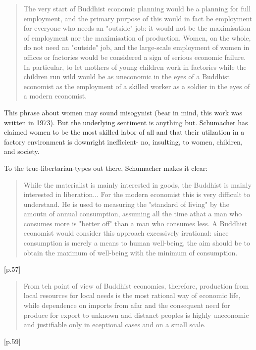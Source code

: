 \documentclass[letterpaper]{article}
\begin{document}

\begin{quote}
The very start of Buddhist economic planning would be a planning for full employment, and the primary purpose of this would in fact be employment for everyone who needs an "outside" job: it would not be the maximisation of employment nor the maximisation of production. Women, on the whole, do not need an "outside" job, and the large-scale employment of women in offices or factories would be considered a sign of serious economic failure. In particular, to let mothers of young children work in factories while the children run wild would be as uneconomic in the eyes of a Buddhist economist as the employment of a skilled worker as a soldier in the eyes of a modern economist.
\end{quote}

This phrase about women may sound misogynist (bear in mind, this work was written in 1973). But the underlying sentiment is anything but. Schumacher has claimed women to be the most skilled labor of all and that their utilzation in a factory environment is downright inefficient- no, insulting, to women, children, and society.

To the true-libertarian-types out there, Schumacher makes it clear:

\begin{quote}
While the materialist is mainly interested in goods, the Buddhist is mainly interested in liberation... For the modern economist this is very difficult to understand. He is used to measuring the "standard of living" by the amoutn of annual consumption, assuming all the time athat a man who consumes more is "better off" than a man who consumes less. A Buddhist economist would consider this approach excessively irrational: since consumption is merely a means to human well-being, the aim should be to obtain the maximum of well-being with the minimum of consumption.
\end{quote} [p.57]

\begin{quote}
From teh point of view of Buddhist economics, therefore, production from local resources for local needs is the most rational way of economic life, while dependence on imports from afar and the consequent need for produce for export to unknown and distanct peoples is highly uneconomic and justifiable only in eceptional cases and on a small scale.
\end{quote} [p.59]
\end{document}
